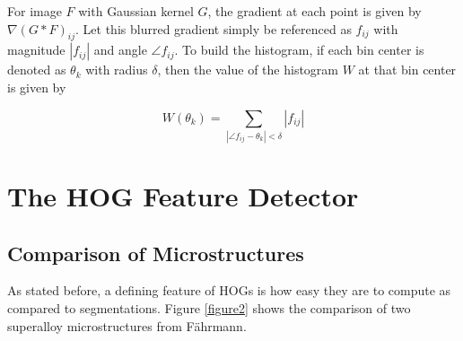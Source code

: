 \documentclass[review]{elsarticle}
\begin{document}
		For image $F$ with Gaussian kernel $G$, the gradient at each point is given by $\nabla \left( G \ast F \right)_{ij}$. Let this blurred gradient simply be referenced as $f_{ij}$ with magnitude $\left| f_{ij} \right|$ and angle $\angle f_{ij}$. To build the histogram, if each bin center is denoted as $\theta_k$ with radius $\delta$, then the value of the histogram $W$ at that bin center is given by

		\begin{equation}
			W \left( \theta_k \right) = \sum_{\left| \angle f_{ij} - \theta_k \right| < \delta} \left| f_{ij} \right|
		\end{equation}

	\section{The HOG Feature Detector}\label{hog}
	\subsection{Comparison of Microstructures}
	As stated before, a defining feature of HOGs is how easy they are to compute as compared to segmentations. Figure \ref{figure2} shows the comparison of two superalloy microstructures from F\"ahrmann\cite{faehrmann}.
\end{document}
